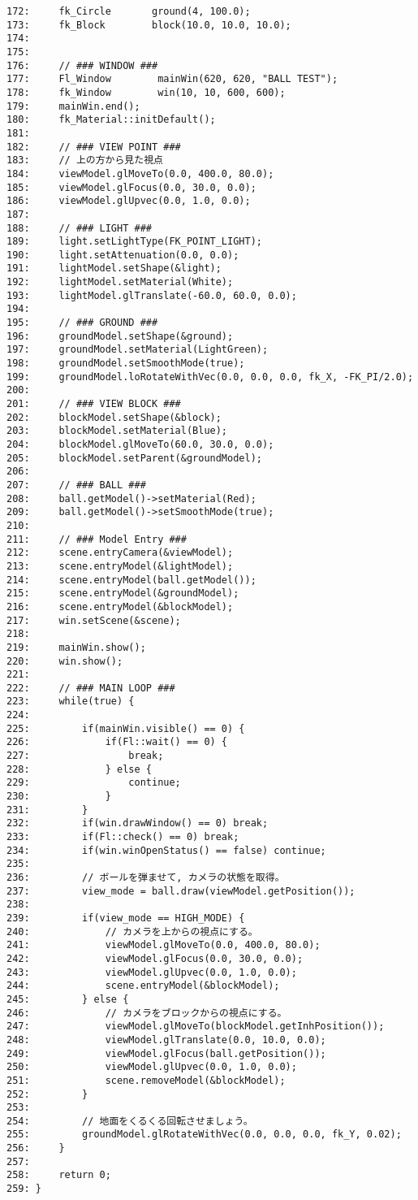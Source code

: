 \begin{breakbox}
\begin{verbatim}
172:     fk_Circle       ground(4, 100.0);
173:     fk_Block        block(10.0, 10.0, 10.0);
174: 
175: 
176:     // ### WINDOW ###
177:     Fl_Window        mainWin(620, 620, "BALL TEST");
178:     fk_Window        win(10, 10, 600, 600);
179:     mainWin.end();
180:     fk_Material::initDefault();
181: 
182:     // ### VIEW POINT ###
183:     // 上の方から見た視点
184:     viewModel.glMoveTo(0.0, 400.0, 80.0);
185:     viewModel.glFocus(0.0, 30.0, 0.0);
186:     viewModel.glUpvec(0.0, 1.0, 0.0);
187: 
188:     // ### LIGHT ###
189:     light.setLightType(FK_POINT_LIGHT);
190:     light.setAttenuation(0.0, 0.0);
191:     lightModel.setShape(&light);
192:     lightModel.setMaterial(White);
193:     lightModel.glTranslate(-60.0, 60.0, 0.0);
194: 
195:     // ### GROUND ###
196:     groundModel.setShape(&ground);
197:     groundModel.setMaterial(LightGreen);
198:     groundModel.setSmoothMode(true);
199:     groundModel.loRotateWithVec(0.0, 0.0, 0.0, fk_X, -FK_PI/2.0);
200: 
201:     // ### VIEW BLOCK ###
202:     blockModel.setShape(&block);
203:     blockModel.setMaterial(Blue);
204:     blockModel.glMoveTo(60.0, 30.0, 0.0);
205:     blockModel.setParent(&groundModel);
206: 
207:     // ### BALL ###
208:     ball.getModel()->setMaterial(Red);
209:     ball.getModel()->setSmoothMode(true);
210:     
211:     // ### Model Entry ###
212:     scene.entryCamera(&viewModel);
213:     scene.entryModel(&lightModel);
214:     scene.entryModel(ball.getModel());
215:     scene.entryModel(&groundModel);
216:     scene.entryModel(&blockModel); 
217:     win.setScene(&scene);
218: 
219:     mainWin.show();
220:     win.show();
221: 
222:     // ### MAIN LOOP ###
223:     while(true) {
224: 
225:         if(mainWin.visible() == 0) {
226:             if(Fl::wait() == 0) {
227:                 break;
228:             } else {
229:                 continue;
230:             }
231:         }
232:         if(win.drawWindow() == 0) break;
233:         if(Fl::check() == 0) break;
234:         if(win.winOpenStatus() == false) continue;
235: 
236:         // ボールを弾ませて, カメラの状態を取得。
237:         view_mode = ball.draw(viewModel.getPosition());
238: 
239:         if(view_mode == HIGH_MODE) {
240:             // カメラを上からの視点にする。
241:             viewModel.glMoveTo(0.0, 400.0, 80.0);
242:             viewModel.glFocus(0.0, 30.0, 0.0);
243:             viewModel.glUpvec(0.0, 1.0, 0.0);
244:             scene.entryModel(&blockModel);
245:         } else {
246:             // カメラをブロックからの視点にする。
247:             viewModel.glMoveTo(blockModel.getInhPosition());
248:             viewModel.glTranslate(0.0, 10.0, 0.0);
249:             viewModel.glFocus(ball.getPosition());
250:             viewModel.glUpvec(0.0, 1.0, 0.0);
251:             scene.removeModel(&blockModel);
252:         }
253: 
254:         // 地面をくるくる回転させましょう。
255:         groundModel.glRotateWithVec(0.0, 0.0, 0.0, fk_Y, 0.02);
256:     }
257: 
258:     return 0;
259: }
\end{verbatim}
\end{breakbox}
